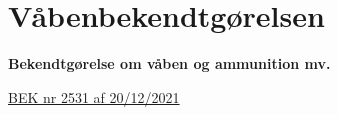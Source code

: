 \section{Våbenbekendtgørelsen}

\begin{frame}
\vspace{3em}
\begin{center}
{\LARGE \textbf{Bekendtgørelse om våben og ammunition mv.}}
\vspace{2em}
\par
{\normalsize \href{https://www.retsinformation.dk/eli/lta/2021/2531}{BEK nr 2531 af 20/12/2021}}
\vspace{1em}
\par

\end{center}
\end{frame}





